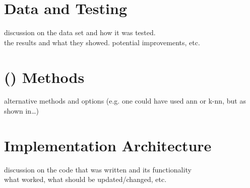 \label{chap:chapter5}

\section{Data and Testing}
\label{sec:data_and_testing}
discussion on the data set and how it was tested. \\
the results and what they showed. potential improvements, etc.

\section{ () Methods}
\label{sec:ai_methods}
alternative methods and options (e.g. one could have used ann or k-nn, but as shown in\ldots)

\section{Implementation Architecture}
\label{sec:implemented_architecture}
discussion on the code that was written and its functionality \\
what worked, what should be updated/changed, etc.

